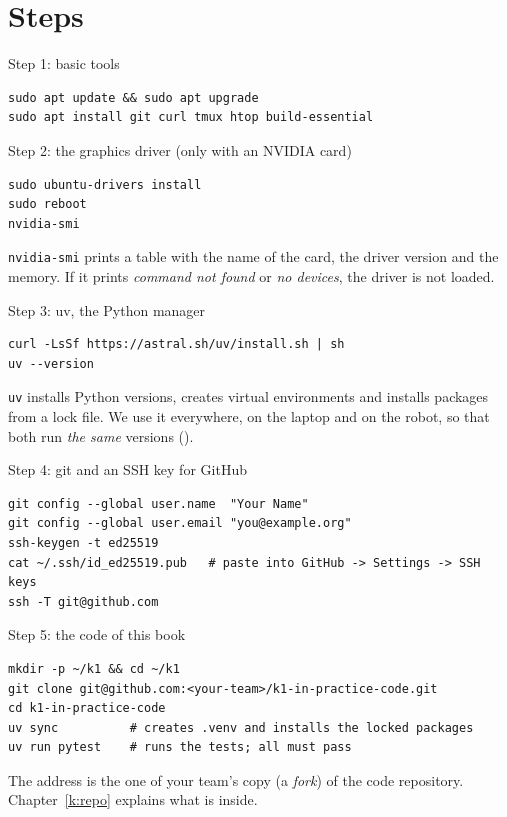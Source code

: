 \section*{Steps}
\begin{stepbox}{Step 1: basic tools}
\begin{verbatim}
sudo apt update && sudo apt upgrade
sudo apt install git curl tmux htop build-essential
\end{verbatim}
\end{stepbox}

\begin{stepbox}{Step 2: the graphics driver (only with an NVIDIA card)}
\begin{verbatim}
sudo ubuntu-drivers install
sudo reboot
nvidia-smi
\end{verbatim}
\verb!nvidia-smi! prints a table with the name of the card, the driver version and the memory. If it prints \emph{command not found} or \emph{no devices}, the driver is not loaded.
\end{stepbox}

\begin{stepbox}{Step 3: uv, the Python manager}
\begin{verbatim}
curl -LsSf https://astral.sh/uv/install.sh | sh
uv --version
\end{verbatim}
\texttt{uv} installs Python versions, creates virtual environments and installs packages from a lock file. We use it everywhere, on the laptop and on the robot, so that both run \emph{the same} versions ().
\end{stepbox}

\begin{stepbox}{Step 4: git and an SSH key for GitHub}
\begin{verbatim}
git config --global user.name  "Your Name"
git config --global user.email "you@example.org"
ssh-keygen -t ed25519
cat ~/.ssh/id_ed25519.pub   # paste into GitHub -> Settings -> SSH keys
ssh -T git@github.com
\end{verbatim}
\end{stepbox}

\begin{stepbox}{Step 5: the code of this book}
\begin{verbatim}
mkdir -p ~/k1 && cd ~/k1
git clone git@github.com:<your-team>/k1-in-practice-code.git
cd k1-in-practice-code
uv sync          # creates .venv and installs the locked packages
uv run pytest    # runs the tests; all must pass
\end{verbatim}
The address is the one of your team's copy (a \emph{fork}) of the code repository\guess. Chapter~\ref{k:repo} explains what is inside.
\end{stepbox}

